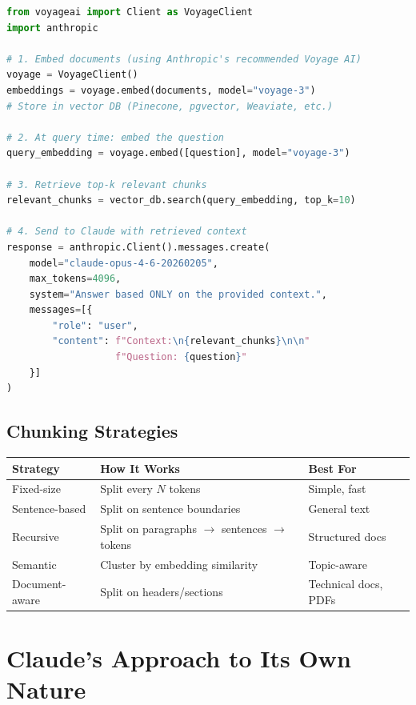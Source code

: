 \documentclass[11pt,a4paper]{article}
\begin{document}
\begin{lstlisting}[language=Python, caption={RAG with Voyage AI + Claude}]
from voyageai import Client as VoyageClient
import anthropic

# 1. Embed documents (using Anthropic's recommended Voyage AI)
voyage = VoyageClient()
embeddings = voyage.embed(documents, model="voyage-3")
# Store in vector DB (Pinecone, pgvector, Weaviate, etc.)

# 2. At query time: embed the question
query_embedding = voyage.embed([question], model="voyage-3")

# 3. Retrieve top-k relevant chunks
relevant_chunks = vector_db.search(query_embedding, top_k=10)

# 4. Send to Claude with retrieved context
response = anthropic.Client().messages.create(
    model="claude-opus-4-6-20260205",
    max_tokens=4096,
    system="Answer based ONLY on the provided context.",
    messages=[{
        "role": "user",
        "content": f"Context:\n{relevant_chunks}\n\n"
                   f"Question: {question}"
    }]
)
\end{lstlisting}

\subsection{Chunking Strategies}

\begin{center}
\begin{tabular}{lL{5cm}L{4cm}}
\toprule
\textbf{Strategy} & \textbf{How It Works} & \textbf{Best For} \\
\midrule
Fixed-size & Split every $N$ tokens & Simple, fast \\
Sentence-based & Split on sentence boundaries & General text \\
Recursive & Split on paragraphs $\to$ sentences $\to$ tokens & Structured docs \\
Semantic & Cluster by embedding similarity & Topic-aware \\
Document-aware & Split on headers/sections & Technical docs, PDFs \\
\bottomrule
\end{tabular}
\end{center}

\section{Claude's Approach to Its Own Nature}
\end{document}
